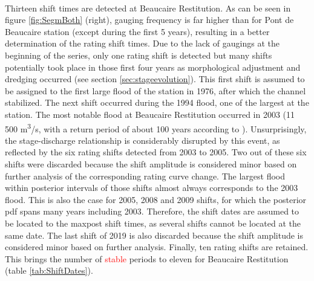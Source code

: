 \documentclass[11pt]{article}
\begin{document}
    \paragraph{}    
    Thirteen shift times are detected at Beaucaire Restitution. As can be seen in figure \ref{fig:SegmBoth} (right), gauging frequency is far higher than for Pont de Beaucaire station (except during the first 5 years), resulting in a better determination of the rating shift times. 
    Due to the lack of gaugings at the beginning of the series, only one rating shift is detected but many shifts potentially took place in those first four years as morphological adjustment and dredging occurred (see section \ref{sec:stageevolution}). This first shift is assumed to be assigned to the first large flood of the station in 1976, after which the channel stabilized. The next shift occurred during the 1994 flood, one of the largest at the station. The most notable flood at Beaucaire Restitution occurred in 2003 (11 500 m\textsuperscript{3}/s, with a return period of about 100 years according to \citet{medd_debit_2005}). Unsurprisingly, the stage-discharge relationship is considerably disrupted by this event, as reflected by the six rating shifts detected from 2003 to 2005. Two out of these six shifts were discarded because the shift amplitude is considered minor based on further analysis of the corresponding rating curve change. The largest flood within posterior intervals of those shifts almost always corresponds to the 2003 flood. This is also the case for 2005, 2008 and 2009 shifts, for which the posterior pdf spans many years including 2003. Therefore, the shift dates are assumed to be located to the maxpost shift times, as several shifts cannot be located at the same date. The last shift of 2019 is also discarded because the shift amplitude is considered minor based on further analysis. Finally, ten rating shifts are retained. This brings the number of \textcolor{red}{stable} periods to eleven for Beaucaire Restitution (table \ref{tab:ShiftDates}). 
    \FloatBarrier
\end{document}
